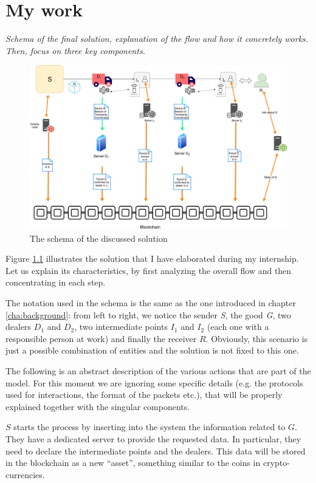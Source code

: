 \chapter{My work}
\label{cha:main}
\textit{Schema of the final solution, explanation of the flow and how it concretely works. Then, focus on three key components.}

\begin{figure}[H]
    \centering
    \includegraphics[scale=0.45]{figures/solution.pdf}
    \caption{The schema of the discussed solution}
    \label{fig:solution}
\end{figure}

Figure \ref{fig:solution} illustrates the solution that I have elaborated during my internship. Let us explain its characteristics, by first analyzing the overall flow and then concentrating in each step.

The notation used in the schema is the same as the one introduced in chapter \ref{cha:background}: from left to right, we notice the sender \textit{S}, the good \textit{G}, two dealers $D_1$ and $D_2$, two intermediate points $I_1$ and $I_2$ (each one with a responsible person at work) and finally the receiver $R$. Obviously, this scenario is just a possible combination of entities and the solution is not fixed to this one.

The following is an abstract description of the various actions that are part of the model. For this moment we are ignoring some specific details (e.g. the protocols used for interactions, the format of the packets etc.), that will be properly explained together with the singular components.

$S$ starts the process by inserting into the system the information related to $G$. They have a dedicated server to provide the requested data. In particular, they need to declare the intermediate points and the dealers. This data will be stored in the blockchain as a new ``asset'', something similar to the coins in crypto-currencies. 

